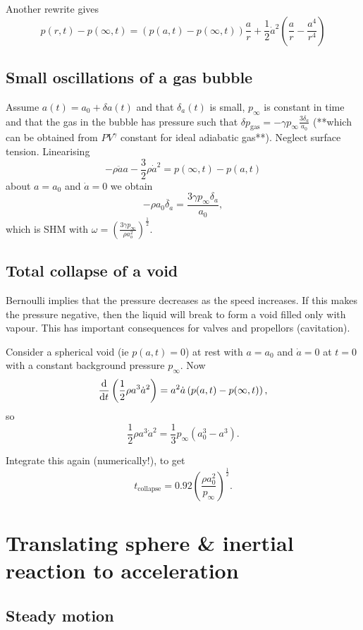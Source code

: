 \documentclass{notes}
\begin{document}
Another rewrite gives
\[
p(r,t)-p(\infty,t) = \left( p(a,t) - p(\infty,t) \right)\frac{a}{r} +
\frac{1}{2} \dot{a}^2 \left( \frac{a}{r} -\frac{a^4}{r^4} \right)
\]

\subsection{Small oscillations of a gas bubble}

Assume $a(t) = a_0 + \delta a(t)$ and that $\delta_a(t)$ is small,
$p_\infty$ is constant in time and that the gas in the bubble has
pressure such that $\delta p_{\text{gas}} = - \gamma p_\infty \frac{3
  \delta_a}{a_0}$ (**which can be obtained from $P V^\gamma$ constant
for ideal adiabatic gas**).  Neglect surface tension.  Linearising
\[
-\rho \ddot{a}a -\frac{3}{2} \rho \dot{a}^2 = p(\infty,t) - p(a,t)
\]
about $a=a_0$ and $\dot{a} = 0$ we obtain
\[
-\rho a_0 \ddot{\delta_a} = \frac{3 \gamma p_\infty \delta_a}{a_0},
\]
which is SHM with $\omega = \left(\frac{3 \gamma p_\infty}{\rho
    a_o^2}\right)^{\frac{1}{2}}$.

\subsection{Total collapse of a void}

Bernoulli implies that the pressure decreases as the speed increases.
If this makes the pressure negative, then the liquid will break to
form a void filled only with vapour. This has important consequences
for valves and propellors (cavitation).

Consider a spherical void (ie $p(a,t) = 0$) at rest with $a = a_0$ and
$\dot{a} = 0$ at $t=0$ with a constant background pressure
$p_\infty$.  Now
\[
\frac{\mathrm{d}}{\mathrm{d} t}\left( \frac{1}{2}\rho a^3 \dot{a}^2 \right) = a^2
\dot{a} \left( p(a,t) - p(\infty,t) \right),
\]
so
\[
\frac{1}{2} \rho a^3 \dot{a}^2 = \frac{1}{3} p_\infty \left( a_0^3
  -a^3 \right).
\]

Integrate this again (numerically!), to get
\[
t_{\text{collapse}} = 0.92 \left( \frac{\rho a_0^2}{p_\infty}
\right)^{\frac{1}{2}}.
\]

\section[Translating Sphere]%
{Translating sphere \& inertial reaction to acceleration}

\subsection{Steady motion}
\end{document}

